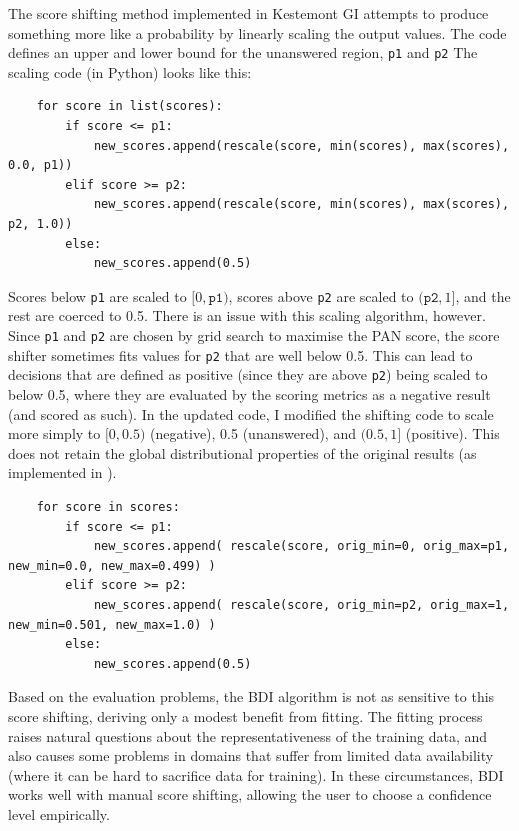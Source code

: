 \documentclass[
    hf
]{ceurart}
\begin{document}
The score shifting method implemented in Kestemont GI attempts to produce something more like a
probability by linearly scaling the output values. The code defines an upper and lower bound for the
unanswered region, \texttt{p1} and \texttt{p2} The scaling code (in Python) looks like this:

\begin{verbatim}
    for score in list(scores):
        if score <= p1:
            new_scores.append(rescale(score, min(scores), max(scores), 0.0, p1))
        elif score >= p2:
            new_scores.append(rescale(score, min(scores), max(scores), p2, 1.0))
        else:
            new_scores.append(0.5)
\end{verbatim}

Scores below \texttt{p1} are scaled to $[0,\texttt{p1})$, scores above \texttt{p2} are scaled to
$(\texttt{p2},1]$, and the rest are coerced to 0.5. There is an issue with this scaling algorithm,
however. Since \texttt{p1} and \texttt{p2} are chosen by grid search to maximise the PAN score, the
score shifter sometimes fits values for \texttt{p2} that are well below 0.5. This can lead to
decisions that are defined as positive (since they are above \texttt{p2}) being scaled to below 0.5,
where they are evaluated by the scoring metrics as a negative result (and scored as such). In the
updated code, I modified the shifting code to scale more simply to $[0,0.5)$ (negative), 0.5
(unanswered), and $(0.5,1]$ (positive). This does not retain the global distributional properties of
the original results (as implemented in \cite{kestemont_caesar}).

\begin{verbatim}
    for score in scores: 
        if score <= p1: 
            new_scores.append( rescale(score, orig_min=0, orig_max=p1, new_min=0.0, new_max=0.499) ) 
        elif score >= p2: 
            new_scores.append( rescale(score, orig_min=p2, orig_max=1, new_min=0.501, new_max=1.0) )
        else: 
            new_scores.append(0.5)
\end{verbatim}

Based on the evaluation problems, the BDI algorithm is not as sensitive to this score shifting,
deriving only a modest benefit from fitting. The fitting process raises natural questions about the
representativeness of the training data, and also causes some problems in domains that suffer from
limited data availability (where it can be hard to sacrifice data for training). In these
circumstances, BDI works well with manual score shifting, allowing the user to choose a confidence
level empirically.
\end{document}
